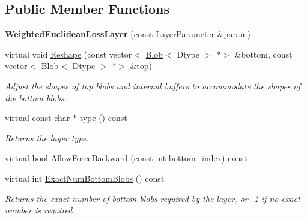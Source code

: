 \subsection*{Public Member Functions}
\begin{DoxyCompactItemize}
\item 
\mbox{\label{classcaffe_1_1_weighted_euclidean_loss_layer_aa2c9f118a064b055a2f887c43f24bab4}} 
{\bfseries Weighted\+Euclidean\+Loss\+Layer} (const \mbox{\hyperlink{classcaffe_1_1_layer_parameter}{Layer\+Parameter}} \&param)
\item 
virtual void \mbox{\hyperlink{classcaffe_1_1_weighted_euclidean_loss_layer_a98e3de49ab49d66b8e3ebfe3aa4fbe20}{Reshape}} (const vector$<$ \mbox{\hyperlink{classcaffe_1_1_blob}{Blob}}$<$ Dtype $>$ $\ast$$>$ \&bottom, const vector$<$ \mbox{\hyperlink{classcaffe_1_1_blob}{Blob}}$<$ Dtype $>$ $\ast$$>$ \&top)
\begin{DoxyCompactList}\small\item\em Adjust the shapes of top blobs and internal buffers to accommodate the shapes of the bottom blobs. \end{DoxyCompactList}\item 
\mbox{\label{classcaffe_1_1_weighted_euclidean_loss_layer_a3c470122857ae006730dadf26a015b79}} 
virtual const char $\ast$ \mbox{\hyperlink{classcaffe_1_1_weighted_euclidean_loss_layer_a3c470122857ae006730dadf26a015b79}{type}} () const
\begin{DoxyCompactList}\small\item\em Returns the layer type. \end{DoxyCompactList}\item 
virtual bool \mbox{\hyperlink{classcaffe_1_1_weighted_euclidean_loss_layer_a6b996834a2a27bb8d2d9b48873b6cd65}{Allow\+Force\+Backward}} (const int bottom\+\_\+index) const
\item 
virtual int \mbox{\hyperlink{classcaffe_1_1_weighted_euclidean_loss_layer_a2ac1ab6f657c6531dee37f80a971bbd9}{Exact\+Num\+Bottom\+Blobs}} () const
\begin{DoxyCompactList}\small\item\em Returns the exact number of bottom blobs required by the layer, or -\/1 if no exact number is required. \end{DoxyCompactList}\item 
\mbox{\label{classcaffe_1_1_weighted_euclidean_loss_layer_aa2c9f118a064b055a2f887c43f24bab4}} 

\end{DoxyCompactItemize}
